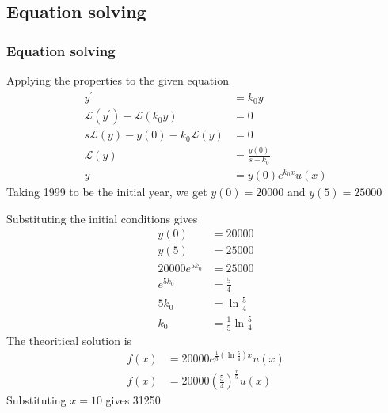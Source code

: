 \documentclass{beamer}
\providecommand{\brak}[1]{\ensuremath{\left(#1\right)}}
\theoremstyle{remark}
\numberwithin{equation}{section}
\begin{document}
\subsection{Equation solving}
\begin{frame}
\frametitle{Equation solving}
Applying the properties to the given equation
\begin{align}
	y^{\prime} &= k_{0}y\\
	\mathcal{L}\brak{y^\prime} - \mathcal{L}\brak{k_{0}y}&= 0\\
	s\mathcal{L}\brak{y} - y\brak{0} - k_{0}\mathcal{L}\brak{y} &= 0\\
	\mathcal{L}\brak{y} &= \frac{y\brak{0}}{s - k_{0}}\\
	y &= y\brak{0}e^{k_{0}x}u\brak{x}
\end{align}
Taking 1999 to be the initial year, we get $y\brak{0} = 20000$ and $y\brak{5} = 25000$\\
\end{frame}
\begin{frame}
Substituting the initial conditions gives
\begin{align}
	y\brak{0} &= 20000\\
	y\brak{5} &= 25000\\
	20000e^{5k_{0}} &= 25000\\
	e^{5k_{0}} &= \frac{5}{4}\\
	5k_{0} &= \ln{\frac{5}{4}}\\
	k_{0} &= \frac{1}{5}\ln{\frac{5}{4}}
\end{align}
The theoritical solution is 
\begin{align}
	f\brak{x} &= 20000e^{\frac{1}{5}\brak{\ln{\frac{5}{4}}}x}u\brak{x}\\
	f\brak{x} &= 20000\brak{\frac{5}{4}}^{\frac{x}{5}}u\brak{x	}
\end{align}
Substituting $x=10$ gives 31250
\end{frame}
\end{document}
